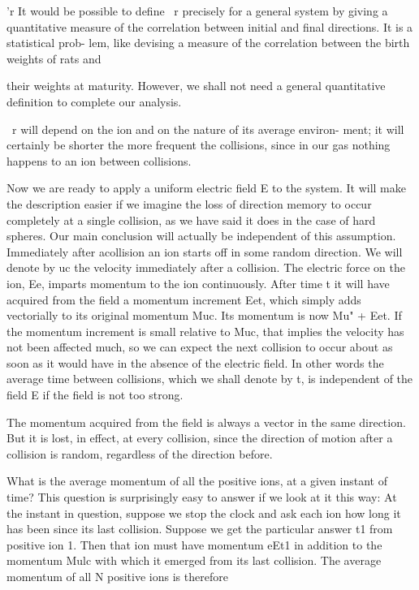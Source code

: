 'r It would be possible to define ~r precisely for a general system by giving a quantitative
measure of the correlation between initial and final directions. It is a statistical prob-
lem, like devising a measure of the correlation between the birth weights of rats and

their weights at maturity. However, we shall not need a general quantitative definition
to complete our analysis.

~r will depend on the ion and on the nature of its average environ-
ment; it will certainly be shorter the more frequent the collisions,
since in our gas nothing happens to an ion between collisions.

Now we are ready to apply a uniform electric field E to the system.
It will make the description easier if we imagine the loss of direction
memory to occur completely at a single collision, as we have said it
does in the case of hard spheres. Our main conclusion will actually
be independent of this assumption. Immediately after acollision
an ion starts off in some random direction. We will denote by uc
the velocity immediately after a collision. The electric force on the
ion, Ee, imparts momentum to the ion continuously. After time t
it will have acquired from the field a momentum increment Eet,
which simply adds vectorially to its original momentum Muc. Its
momentum is now Mu" + Eet. If the momentum increment is small
relative to Muc, that implies the velocity has not been affected much,
so we can expect the next collision to occur about as soon as it would
have in the absence of the electric field. In other words the average
time between collisions, which we shall denote by t, is independent
of the field E if the field is not too strong.

The momentum acquired from the field is always a vector in the
same direction. But it is lost, in effect, at every collision, since the
direction of motion after a collision is random, regardless of the
direction before.

What is the average momentum of all the positive ions, at a given
instant of time? This question is surprisingly easy to answer if we
look at it this way: At the instant in question, suppose we stop the
clock and ask each ion how long it has been since its last collision.
Suppose we get the particular answer t1 from positive ion 1. Then
that ion must have momentum eEt1 in addition to the momentum
Mulc with which it emerged from its last collision. The average
momentum of all N positive ions is therefore

